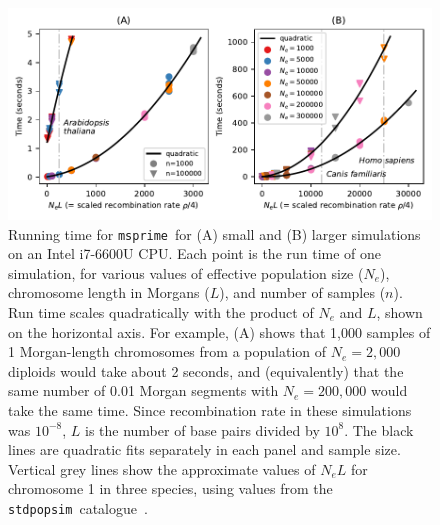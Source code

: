 \documentclass{article}
\newcommand{\msprime}[0]{\texttt{msprime}}
\newcommand{\stdpopsim}[0]{\texttt{stdpopsim}}
\begin{document}
\begin{figure}
\begin{center}
    \includegraphics{figures/ancestry-perf}
\end{center}
\caption{\label{fig-ancestry-perf}
    Running time for \msprime\
    for (A) small and (B) larger simulations on an Intel i7-6600U CPU.
    Each point is the run time of one simulation,
    for various values of effective population size ($N_e$),
    chromosome length in Morgans ($L$), and number of samples ($n$).
    Run time scales quadratically with the product of $N_e$ and $L$,
    shown on the horizontal axis. For example, (A) shows that
    1,000 samples of 1 Morgan-length chromosomes
    from a population of $N_e=2,000$ diploids
    would take about 2 seconds, and (equivalently) that the same number of
    0.01 Morgan segments with $N_e=200,000$ would take the same time.
    Since recombination rate in these simulations was $10^{-8}$,
    $L$ is the number of base pairs divided by $10^8$.
    The black lines are quadratic fits separately in each panel
    and sample size. Vertical grey lines show the approximate values of
    $N_e L$ for chromosome 1 in three species, using values from
    the \stdpopsim\ catalogue~\citep{adrion2020community}.
}
\end{figure}

\end{document}
